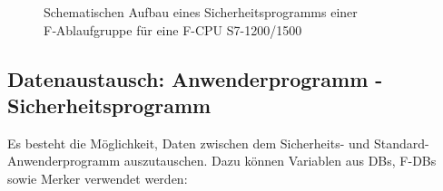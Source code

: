 \begin{figure}[H]
   \centering
   \caption[Aufbau Sicherheitsprogramm]{Schematischen Aufbau eines Sicherheitsprogramms \bzw einer F‑Ablaufgruppe für eine F-CPU S7-1200/1500}
   \label{fig:Bild2.2}
\end{figure}

\clearpage
\subsection{Datenaustausch: Anwenderprogramm - Sicherheitsprogramm}

Es besteht die Möglichkeit, Daten zwischen dem Sicherheits- und Standard- Anwenderprogramm auszutauschen. Dazu können Variablen aus DBs, F-DBs sowie Merker verwendet werden:

